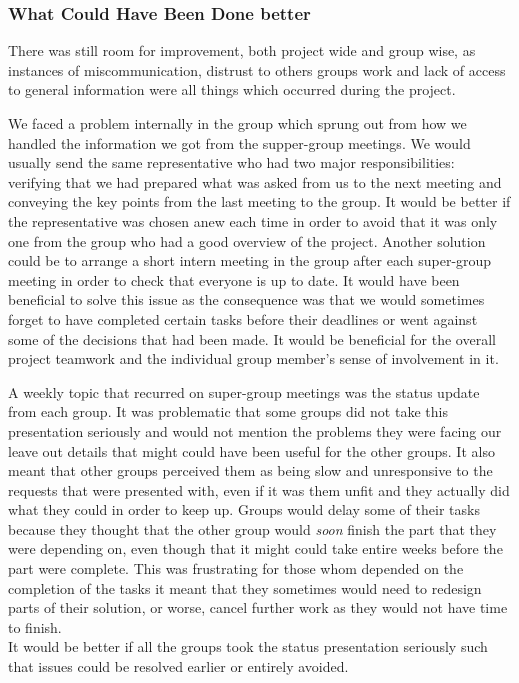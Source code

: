 \subsubsection*{What Could Have Been Done better}
There was still room for improvement, both project wide and group wise, as instances of miscommunication, distrust to others groups work and lack of access to general information were all things %
 which occurred during the project.

We faced a problem internally in the group which sprung out from how we handled the information we got from the supper-group meetings. We would usually send the same representative who had two major responsibilities: verifying that we had prepared what was asked from us to the next meeting and conveying the key points from the last meeting to the group. It would be better if the representative was chosen anew each time in order to avoid that it was only one from the group who had a good overview of the project. Another solution could be to arrange a short intern meeting in the group after each super-group meeting in order to check that everyone is up to date. It would have been beneficial to solve this issue as the consequence was that we would sometimes forget to have completed certain tasks before their deadlines or went against some of the decisions that had been made. It would be beneficial for the overall project teamwork and the individual group member's sense of involvement in it.

A weekly topic that recurred on super-group meetings was the status update from each group. It was problematic that some groups did not take this presentation seriously and would not mention the problems they were facing our leave out details that might could have been useful for the other groups. It also meant that other groups perceived them as being slow and unresponsive to the requests that were presented with, even if it was them unfit and they actually did what they could in order to keep up. Groups would delay some of their tasks because they thought that the other group would \textit{soon} finish the part that they were depending on, even though that it might could take entire weeks before the part were complete. This was frustrating for those whom depended on the completion of the tasks it meant that they sometimes would need to redesign parts of their solution, or worse, cancel further work as they would not have time to finish. \\
It would be better if all the groups took the status presentation seriously such that issues could be resolved earlier or entirely avoided. %


